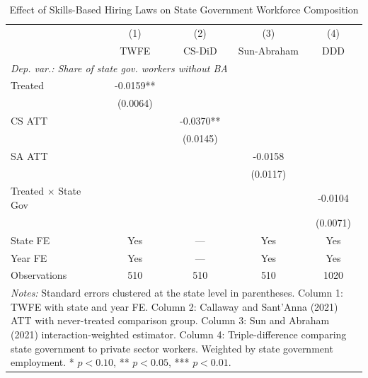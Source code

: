 \begin{table}[htbp]
\centering
\caption{Effect of Skills-Based Hiring Laws on State Government Workforce Composition}
\label{tab:main}
\begin{tabular}{lcccc}
\hline\hline
 & (1) & (2) & (3) & (4) \\
 & TWFE & CS-DiD & Sun-Abraham & DDD \\
\hline
\multicolumn{5}{l}{\textit{Dep. var.: Share of state gov. workers without BA}} \\
[0.5em]
Treated & -0.0159** & & & \\
 & (0.0064) & & & \\
CS ATT & & -0.0370** & & \\
 & & (0.0145) & & \\
SA ATT & & & -0.0158 & \\
 & & & (0.0117) & \\
Treated $\times$ State Gov & & & & -0.0104 \\
 & & & & (0.0071) \\
[0.5em]
State FE & Yes & --- & Yes & Yes \\
Year FE & Yes & --- & Yes & Yes \\
Observations & 510 & 510 & 510 & 1020 \\
\hline\hline
\multicolumn{5}{p{12cm}}{\footnotesize \textit{Notes:} Standard errors clustered at the state level in parentheses. Column 1: TWFE with state and year FE. Column 2: Callaway and Sant'Anna (2021) ATT with never-treated comparison group. Column 3: Sun and Abraham (2021) interaction-weighted estimator. Column 4: Triple-difference comparing state government to private sector workers. Weighted by state government employment. * $p<0.10$, ** $p<0.05$, *** $p<0.01$.}
\end{tabular}
\end{table}
